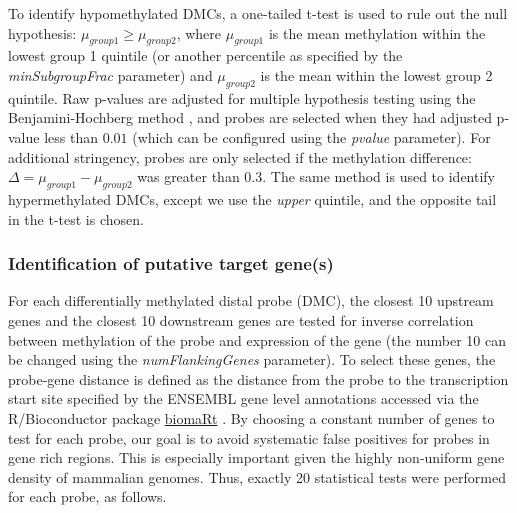 To identify hypomethylated DMCs, a one-tailed t-test is used to rule out the null hypothesis: $\mu_{group1} \geq \mu_{group2}$, where $\mu_{group1}$ is the mean methylation within the lowest group 1 quintile (or another percentile as specified by the \textit{minSubgroupFrac} parameter) and $\mu_{group2}$ is the mean within the lowest group 2 quintile. Raw p-values are adjusted for multiple hypothesis testing using the Benjamini-Hochberg method \cite{benjamini1995controlling}, and probes are selected when they had adjusted p-value less than $0.01$ (which can be configured using the \textit{pvalue} parameter). For additional stringency, probes are only selected if the methylation difference: $\Delta = \mu_{group1} - \mu_{group2}$ was greater than $0.3$. The same method is used to identify hypermethylated DMCs, except we use the \textit{upper} quintile, and the opposite tail in the t-test is chosen.
% 
% 

\subsubsection*{Identification of putative target gene(s)} 

For each differentially methylated distal probe (DMC), the closest 10 upstream 
genes and the closest 10 downstream genes are tested for inverse correlation between 
methylation of the probe and expression of the gene (the number 10 can be changed using the \textit{numFlankingGenes} parameter). To select these genes, 
% 
% 
% 
%
% 
%
the probe-gene distance is defined as the distance from the probe to the transcription 
start site specified by the ENSEMBL gene level annotations \cite{yates2015ensembl} accessed via
the R/Bioconductor package \href{http://bioconductor.org/packages/biomaRt/}{biomaRt} \cite{durinck2009mapping,durinck2005biomart}. By choosing a constant number of genes to test for each probe, our goal is to avoid systematic false positives for probes in gene rich regions. This is especially important given the highly non-uniform gene density of mammalian genomes.
Thus, exactly 20 statistical tests were performed for each probe, as follows. 

